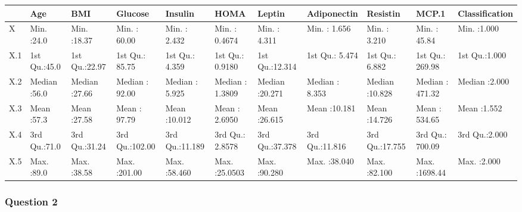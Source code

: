 \documentclass[
]{article}
\begin{document}
\begin{longtable}[]{@{}
  >{\raggedright\arraybackslash}p{}
  >{\raggedright\arraybackslash}p{}
  >{\raggedright\arraybackslash}p{}
  >{\raggedright\arraybackslash}p{}
  >{\raggedright\arraybackslash}p{}
  >{\raggedright\arraybackslash}p{}
  >{\raggedright\arraybackslash}p{}
  >{\raggedright\arraybackslash}p{}
  >{\raggedright\arraybackslash}p{}
  >{\raggedright\arraybackslash}p{}
  >{\raggedright\arraybackslash}p{}@{}}
\toprule
& Age & BMI & Glucose & Insulin & HOMA & Leptin & Adiponectin & Resistin
& MCP.1 & Classification \\
\midrule
\endhead
X & Min. :24.0 & Min. :18.37 & Min. : 60.00 & Min. : 2.432 & Min. :
0.4674 & Min. : 4.311 & Min. : 1.656 & Min. : 3.210 & Min. : 45.84 &
Min. :1.000 \\
X.1 & 1st Qu.:45.0 & 1st Qu.:22.97 & 1st Qu.: 85.75 & 1st Qu.: 4.359 &
1st Qu.: 0.9180 & 1st Qu.:12.314 & 1st Qu.: 5.474 & 1st Qu.: 6.882 & 1st
Qu.: 269.98 & 1st Qu.:1.000 \\
X.2 & Median :56.0 & Median :27.66 & Median : 92.00 & Median : 5.925 &
Median : 1.3809 & Median :20.271 & Median : 8.353 & Median :10.828 &
Median : 471.32 & Median :2.000 \\
X.3 & Mean :57.3 & Mean :27.58 & Mean : 97.79 & Mean :10.012 & Mean :
2.6950 & Mean :26.615 & Mean :10.181 & Mean :14.726 & Mean : 534.65 &
Mean :1.552 \\
X.4 & 3rd Qu.:71.0 & 3rd Qu.:31.24 & 3rd Qu.:102.00 & 3rd Qu.:11.189 &
3rd Qu.: 2.8578 & 3rd Qu.:37.378 & 3rd Qu.:11.816 & 3rd Qu.:17.755 & 3rd
Qu.: 700.09 & 3rd Qu.:2.000 \\
X.5 & Max. :89.0 & Max. :38.58 & Max. :201.00 & Max. :58.460 & Max.
:25.0503 & Max. :90.280 & Max. :38.040 & Max. :82.100 & Max. :1698.44 &
Max. :2.000 \\
\bottomrule
\end{longtable}

\hypertarget{question-2}{%
\subsubsection{Question 2}\label{question-2}}
\end{document}
